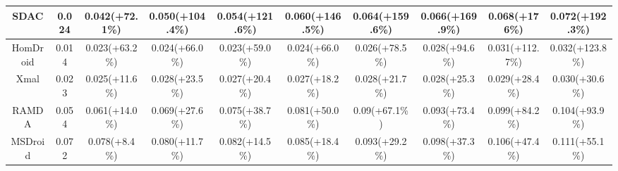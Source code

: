 \begin{table}[t]
\begin{adjustbox}{width=0.99\textwidth}
\begin{tabular}{@{}c|c|c|c|c|c|c|c|c|c@{}}
            SDAC              & 0.024               & 0.042(+72.1\%)      & 0.050(+104.4\%)     & 0.054(+121.6\%)     & 0.060(+146.5\%)      & 0.064(+159.6\%)      & 0.066(+169.9\%)      & 0.068(+176\%)        & 0.072(+192.3\%)      \\ \midrule
            HomDroid          & 0.014               & 0.023(+63.2\%)      & 0.024(+66.0\%)      & 0.023(+59.0\%)      & 0.024(+66.0\%)       & 0.026(+78.5\%)       & 0.028(+94.6\%)       & 0.031(+112.7\%)      & 0.032(+123.8\%)      \\ \midrule
            Xmal              & 0.023               & 0.025(+11.6\%)      & 0.028(+23.5\%)      & 0.027(+20.4\%)      & 0.027(+18.2\%)       & 0.028(+21.7\%)       & 0.028(+25.3\%)       & 0.029(+28.4\%)       & 0.030(+30.6\%)       \\ \midrule
            RAMDA             & 0.054               & 0.061(+14.0\%)      & 0.069(+27.6\%)      & 0.075(+38.7\%)      & 0.081(+50.0\%)       & 0.09(+67.1\%)        & 0.093(+73.4\%)       & 0.099(+84.2\%)       & 0.104(+93.9\%)       \\ \midrule
            MSDroid           & 0.072               & 0.078(+8.4\%)       & 0.080(+11.7\%)      & 0.082(+14.5\%)      & 0.085(+18.4\%)       & 0.093(+29.2\%)       & 0.098(+37.3\%)       & 0.106(+47.4\%)       & 0.111(+55.1\%)       \\ \bottomrule
            \end{tabular}
    \end{adjustbox}
    \label{tab:tpr_time_decay}    
\end{table}
